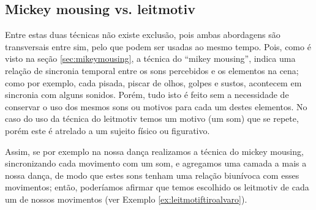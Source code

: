 \subsection{Mickey mousing vs. leitmotiv}
Entre estas duas técnicas não existe exclusão, pois ambas abordagens são transversais entre sim,
pelo que podem ser usadas ao mesmo tempo.
Pois, como é visto na seção \ref{sec:mikeymousing}, a técnica do ``mikey mousing'',
indica uma relação de sincronia temporal entre os sons percebidos e os elementos na cena;
como por exemplo, cada pisada, piscar de olhos, golpes e sustos,  acontecem em sincronia com alguns sonidos.
Porém, tudo isto é feito sem a necessidade de conservar o uso dos mesmos sons ou motivos para cada um destes elementos.
No caso do uso da técnica do leitmotiv temos um motivo (um som)
que se repete, porém este é atrelado a um sujeito físico ou figurativo.

Assim, se por exemplo na nossa dança realizamos a técnica do mickey mousing, 
sincronizando cada movimento com um som, 
e agregamos uma camada a mais a nossa dança, de modo que estes sons tenham uma relação biunívoca com esses movimentos; 
então, poderíamos afirmar que temos escolhido os leitmotiv de cada um de nossos movimentos (ver Exemplo \ref{ex:leitmotiftiroalvaro}). 

